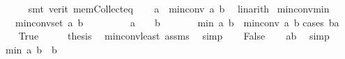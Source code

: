 \begin{isabellebody}
\ \ \ \ \isamarkupfalse%
\ {\isacharparenleft}{\kern0pt}smt\ {\isacharparenleft}{\kern0pt}verit{\isacharparenright}{\kern0pt}\ mem{\isacharunderscore}{\kern0pt}Collect{\isacharunderscore}{\kern0pt}eq{\isacharparenright}{\kern0pt}\isanewline
\ \ \isamarkupfalse%
\ {\isachardoublequoteopen}a\ {\isasymle}\ min{\isacharunderscore}{\kern0pt}conv\ a\ b{\isachardoublequoteclose}\ \isamarkupfalse%
\ linarith\isanewline
{}\isamarkupfalse%
%
\endisatagproof
{\isafoldproof}%
%
\isadelimproof
\isanewline
%
\endisadelimproof
\isanewline
{}\isamarkupfalse%
\ min{\isacharunderscore}{\kern0pt}conv{\isacharunderscore}{\kern0pt}min{\isacharcolon}{\kern0pt}\isanewline
\ \ \ {\isachardoublequoteopen}min{\isacharunderscore}{\kern0pt}conv{\isacharunderscore}{\kern0pt}set\ a\ b\ {\isasymnoteq}\ {\isacharbraceleft}{\kern0pt}{\isacharbraceright}{\kern0pt}{\isachardoublequoteclose}\isanewline
\ \ \ \ \ \ \ {\isachardoublequoteopen}a\ {\isasymge}\ {}{\isachardoublequoteclose}\ \ {\isachardoublequoteopen}b\ {\isasymge}\ {}{\isachardoublequoteclose}\isanewline
\ \ \ \ \ {\isachardoublequoteopen}min\ a\ b\ {\isasymle}\ min{\isacharunderscore}{\kern0pt}conv\ a\ b{\isachardoublequoteclose}\isanewline
%
\isadelimproof
%
\endisadelimproof
%
\isatagproof
{}\isamarkupfalse%
{\isacharparenleft}{\kern0pt}cases\ {\isachardoublequoteopen}b{\isasymge}a{\isachardoublequoteclose}{\isacharparenright}{\kern0pt}\isanewline
\ \ \isamarkupfalse%
\ True\isanewline
\ \ \isamarkupfalse%
\ \isamarkupfalse%
\ {\isacharquery}{\kern0pt}thesis\ \isamarkupfalse%
\ min{\isacharunderscore}{\kern0pt}conv{\isacharunderscore}{\kern0pt}least\ assms{\isacharparenleft}{\kern0pt}{}{\isacharcomma}{\kern0pt}{}{\isacharparenright}{\kern0pt}\ \isamarkupfalse%
\ simp\isanewline
{}\isamarkupfalse%
\isanewline
\ \ \isamarkupfalse%
\ False\isanewline
\ \ \isamarkupfalse%
\ {}{\isacharcolon}{\kern0pt}{\isachardoublequoteopen}a{\isasymge}b{\isachardoublequoteclose}\ \isamarkupfalse%
\ simp\isanewline
\ \ \isamarkupfalse%
\ {}{\isacharcolon}{\kern0pt}{\isachardoublequoteopen}min\ a\ b\ {\isacharequal}{\kern0pt}\ b{\isachardoublequoteclose}\ \isamarkupfalse%

\end{isabellebody}
